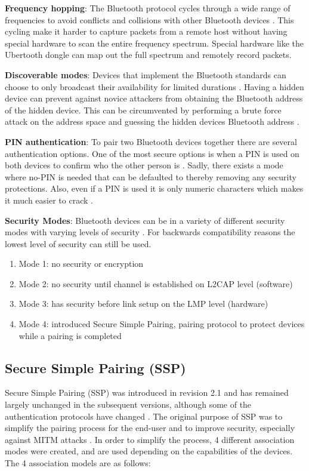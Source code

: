 \documentclass{acm_proc_article-sp}
\begin{document}
\textbf{Frequency hopping}: The Bluetooth protocol cycles through a wide range of frequencies to avoid conflicts and collisions with other Bluetooth devices \cite{ma2007keystroke}. This cycling make it harder to capture packets from a remote host without having special hardware to scan the entire frequency spectrum. Special hardware like the Ubertooth dongle can map out the full spectrum and remotely record packets.

\textbf{Discoverable modes}: Devices that implement the Bluetooth standards can choose to only broadcast their availability for limited durations \cite{ma2007keystroke}. Having a hidden device can prevent against novice attackers from obtaining the Bluetooth address of the hidden device. This can be circumvented by performing a brute force attack on the address space and guessing the hidden devices Bluetooth address \cite{ma2007keystroke}.

\textbf{PIN authentication}: To pair two Bluetooth devices together there are several authentication options. One of the most secure options is when a PIN is used on both devices to confirm who the other person is \cite{ma2007keystroke}. Sadly, there exists a mode where no-PIN is needed that can be defaulted to thereby removing any security protections. Also, even if a PIN is used it is only numeric characters which makes it much easier to crack \cite{ma2007keystroke}.

\textbf{Security Modes}: Bluetooth devices can be in a variety of different security modes with varying levels of security \cite{ma2007keystroke}. For backwards compatibility reasons the lowest level of security can still be used.
\begin{enumerate}
\item Mode 1: no security or encryption
\item Mode 2: no security until channel is established on L2CAP level (software)
\item Mode 3: has security before link setup on the LMP level (hardware)
\item Mode 4: introduced Secure Simple Pairing, pairing protocol to protect devices while a pairing is completed
\end{enumerate}

\subsection{Secure Simple Pairing (SSP)}
Secure Simple Pairing (SSP) was introduced in revision 2.1 and has remained largely unchanged in the subsequent versions, although some of the authentication protocols have changed \cite{barnickel2012implementing}. The original purpose of SSP was to simplify the pairing process for the end-user and to improve security, especially against MITM attacks \cite{sandhya2012analysis}. In order to simplify the process, 4 different association modes were created, and are used depending on the capabilities of the devices. The 4 association models are as follows:
\end{document}
